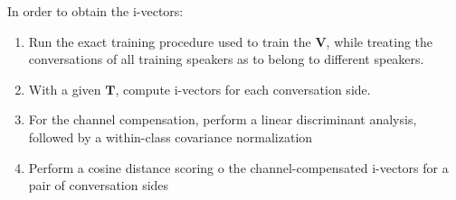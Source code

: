 In order to obtain the i-vectors:
\begin{enumerate}
    \item Run the exact training procedure used to train the $\bm{V}$, while treating the conversations of all training speakers as to belong to different speakers.
    \item With a given $\bm{T}$, compute i-vectors for each conversation side.
    \item For the channel compensation, perform a linear discriminant analysis, followed by a within-class covariance normalization
    \item Perform a cosine distance scoring o the channel-compensated i-vectors for a pair of conversation sides
\end{enumerate}

